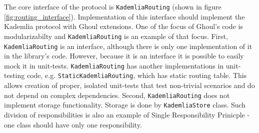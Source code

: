 
%
%

The core interface of the protocol is \texttt{KademliaRouting} (shown in figure \ref{fig:routing_interface}).
Implementation of this interface should implement the Kademlia protocol with Ghoul extensions.
One of the focus of Ghoul's code is modularizabilty and \texttt{KademliaRouting} is an example of that focus.
First, \texttt{KademliaRouting} is an interface, although there is only one implementation of it in the library's code.
However, because it is an interface it is possible to easily mock it in unit-tests.
\texttt{KademliaRouting} has another implementations in unit-testing code, e.g. \texttt{StaticKademliaRouting}, which has static routing table.
This allows creation of proper, isolated unit-tests that test non-trivial scenarios and do not depend on complex dependencies.
Second, \texttt{KademliaRouting} does not implement storage functionality.
Storage is done by \texttt{KademliaStore} class.
Such division of responsibilities is also an example of Single Responsibility
Prinicple - one class should have only one responsibility.

